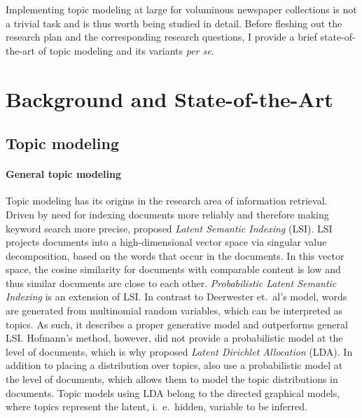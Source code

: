 Implementing topic modeling at large for voluminous newspaper collections is not a trivial task and is thus worth being studied in detail. Before fleshing out the research plan and the corresponding research questions, I provide a brief state-of-the-art of topic modeling and its variants \textit{per se}.

\section{Background and State-of-the-Art}

\subsection{Topic modeling}
\paragraph{General topic modeling}Topic modeling has its origins in the research area of information retrieval. Driven by need for indexing documents more reliably and therefore making keyword search more precise, \citet{deerwesterscottindexing1990} proposed \textit{Latent Semantic Indexing} (LSI). LSI projects documents into a high-dimensional vector space via singular value decomposition, based on the words that occur in the documents. In this vector space, the cosine similarity for documents with comparable content is low and thus similar documents are close to each other. \textit{Probabilistic Latent Semantic Indexing} \citep{hofmannprobabilistic1999} is an extension of LSI. In contrast to Deerwester et.~al's model, words are generated from multinomial random variables, which can be interpreted as topics. As such, it describes a proper generative model and outperforms general LSI. Hofmann's method, however, did not provide a probabilistic model at the level of documents, which is why  \citet{bleilatent2003} proposed \textit{Latent Dirichlet Allocation} (LDA). In addition to placing a distribution over topics, \citet{bleilatent2003} also use a probabilistic model at the level of documents, which allows them to model the topic distributions in documents. Topic models using LDA belong to the directed graphical models, where topics represent the latent, i.~e.~hidden, variable to be inferred.

